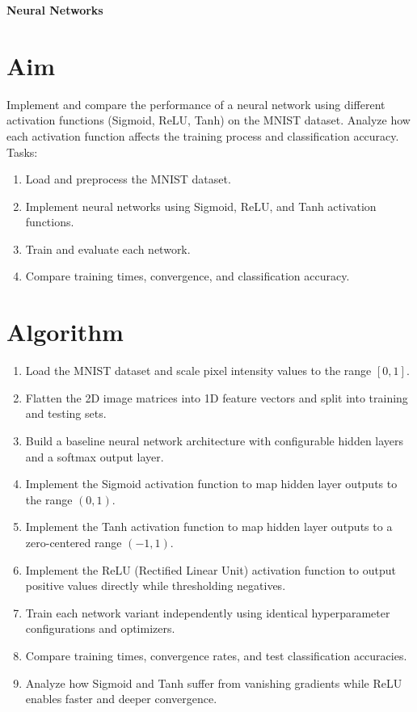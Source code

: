 \documentclass[12pt, a4paper]{report}
\begin{document}
\begin{center}
	{\bfseries \Huge Neural Networks}	
\end{center}

\section*{Aim} 
Implement and compare the performance of a neural network using different activation functions (Sigmoid, ReLU,
Tanh) on the MNIST dataset. Analyze how each activation function affects the training process and classification
accuracy.\\
Tasks:
\begin{enumerate}[\quad -]
	\itemsep 0em 
	
	\item Load and preprocess the MNIST dataset.
	\item Implement neural networks using Sigmoid, ReLU, and Tanh activation functions.
	\item Train and evaluate each network.
	\item Compare training times, convergence, and classification accuracy.
	
\end{enumerate}


\section*{Algorithm} 
\begin{enumerate}
	\item Load the MNIST dataset and scale pixel intensity values to the range $[0, 1]$.
	\item Flatten the 2D image matrices into 1D feature vectors and split into training and testing sets.
	\item Build a baseline neural network architecture with configurable hidden layers and a softmax output layer.
	\item Implement the Sigmoid activation function to map hidden layer outputs to the range $(0, 1)$.
	\item Implement the Tanh activation function to map hidden layer outputs to a zero-centered range $(-1, 1)$.
	\item Implement the ReLU (Rectified Linear Unit) activation function to output positive values directly while thresholding negatives.
	\item Train each network variant independently using identical hyperparameter configurations and optimizers.
	\item Compare training times, convergence rates, and test classification accuracies.
	\item Analyze how Sigmoid and Tanh suffer from vanishing gradients while ReLU enables faster and deeper convergence.
\end{enumerate}
\end{document}
